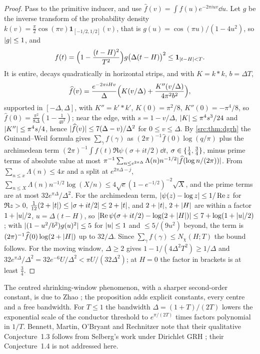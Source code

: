 \begin{proof}
Pass to the primitive inducer, and use $\widehat f(v)=\int f(u)e^{-2\pi iuv}\dd u$. Let $g$ be the inverse transform of
the probability density $k(v)=\tfrac\pi2\cos(\pi v)\mathbf 1_{[-1/2,1/2]}(v)$, that is $g(u)=\cos(\pi u)/(1-4u^2)$, so $\lvert g\rvert\le1$, and
\[
 f(t)=\Bigl(1-\frac{(t-H)^2}{T^2}\Bigr)g\bigl(\Delta(t-H)\bigr)^2\le\mathbf 1_{\lvert t-H\rvert<T}.
\]
It is entire, decays quadratically in horizontal strips, and with $K=k*k$, $b=\Delta T$,
\[
 \widehat f(v)=\frac{e^{-2\pi iHv}}\Delta\Bigl(K(v/\Delta)+\frac{K''(v/\Delta)}{4\pi^2b^2}\Bigr),
\]
supported in $[-\Delta,\Delta]$, with $K''=k'*k'$, $K(0)=\pi^2/8$, $K''(0)=-\pi^4/8$, so $\widehat f(0)=\frac{\pi^2}{8\Delta}(1-\frac1{4b^2})$; near the edge,
with $s=1-v/\Delta$, $\lvert K\rvert\le\pi^4s^3/24$ and $\lvert K''\rvert\le\pi^4s/4$, hence $\lvert\widehat f(v)\rvert\le7(\Delta-v)/\Delta^2$ for $0\le v\le\Delta$. By
\cref{src:thm:dgrh} the Guinand--Weil formula \cite{CarneiroChandeeMilinovich2015Note} gives $\sum_\gamma f(\gamma)$ as
$(2\pi)^{-1}\widehat f(0)\log(q/\pi)$ plus the archimedean term $(2\pi)^{-1}\int f(t)\Re\psi(\sigma+it/2)\dd t$, $\sigma\in\{\tfrac14,\tfrac34\}$, minus
prime terms of absolute value at most $\pi^{-1}\sum_{n\le e^{2\pi\Delta}}\Lambda(n)n^{-1/2}\lvert\widehat f(\log n/(2\pi))\rvert$. From $\sum_{n\le x}\Lambda(n)\le4x$ and
a split at $e^{2\pi\Delta-j}$, $\sum_{n\le X}\Lambda(n)n^{-1/2}\log(X/n)\le4\sqrt e(1-e^{-1/2})^{-2}\sqrt X$, and the prime terms are at most
$32e^{\pi\Delta}/\Delta^2$. For the archimedean term, $\lvert\psi(z)-\log z\rvert\le1/\operatorname{Re} z$ for $\Re z>0$, $\tfrac1{12}(2+\lvert t\rvert)\le\lvert\sigma+it/2\rvert\le2+\lvert t\rvert$,
and $2+\lvert t\rvert$, $2+\lvert H\rvert$ are within a factor $1+\lvert u\rvert/2$, $u=\Delta(t-H)$, so
$\lvert\operatorname{Re}\psi(\sigma+it/2)-\log(2+\lvert H\rvert)\rvert\le7+\log(1+\lvert u\rvert/2)$; with $\lvert(1-u^2/b^2)g(u)^2\rvert\le5$ for $\lvert u\rvert\le1$ and $\le5/(9u^2)$ beyond,
the term is $(2\pi)^{-1}\widehat f(0)\log(2+\lvert H\rvert)$ up to $32/\Delta$. Since $\sum_\gamma f(\gamma)\le N_\chi(H;T)$ the bound follows. For the moving
window, $\Delta\ge2$ gives $1-1/(4\Delta^2T^2)\ge1/\Delta$ and $32e^{\pi\Delta}/\Delta^2=32e^{-6}U/\Delta^2<\pi U/(32\Delta^2)$; at $H=0$ the factor in
brackets is at least $\tfrac34$.
\end{proof}

The centred shrinking-window phenomenon, with a sharper second-order constant, is due to Zhao
\cite[Theorems~1 and~8]{Zhao2025Arxiv}; the proposition adds explicit constants, every centre and a free
bandwidth. For $T\le1$ the bandwidth $\Delta=(1+T)/(2T)$ lowers the exponential scale of the conductor threshold to
$e^{\pi/(2T)}$ times factors polynomial in $1/T$. Bennett, Martin, O'Bryant and Rechnitzer note that their
qualitative Conjecture~1.3 follows from Selberg's work under Dirichlet GRH
\cite{BennettMartinOBryantRechnitzer2021Counting}; their Conjecture~1.4 is not addressed here.

